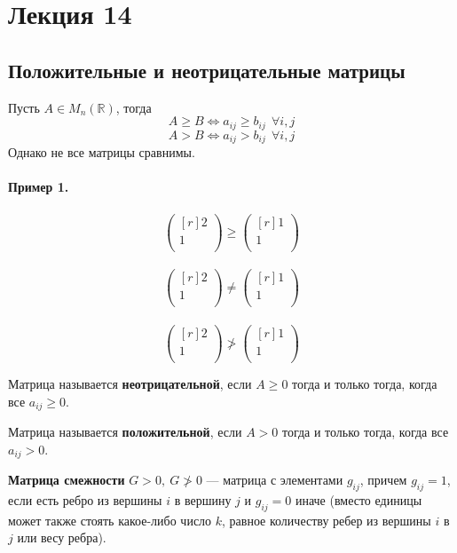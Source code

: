 \newpage
\section{Лекция 14}
\subsection{Положительные и неотрицательные матрицы}
Пусть $A\in M_n(\mathbb{R})$, тогда
$$A\geqslant B \Leftrightarrow a_{ij}\geqslant b_{ij} ~~\forall i, j$$
$$A> B \Leftrightarrow a_{ij}> b_{ij} ~~\forall i, j$$
Однако не все матрицы сравнимы.\\
\\
\textbf{Пример 1.}\\ \\
\[\begin{pmatrix}[r]
2\\
1\\
\end{pmatrix}\geqslant \begin{pmatrix}[r]
1\\
1\\
\end{pmatrix}\]\\
\[\begin{pmatrix}[r]
2\\
1\\
\end{pmatrix}\neq \begin{pmatrix}[r]
1\\
1\\
\end{pmatrix}\]\\
\[\begin{pmatrix}[r]
2\\
1\\
\end{pmatrix}\ngtr \begin{pmatrix}[r]
1\\
1\\
\end{pmatrix}\]
\begin{definition}
    Матрица называется \textbf{неотрицательной}, если $A\geqslant 0$ тогда и только тогда, когда все $a_{ij}\geqslant 0$.
\end{definition}
\begin{definition}
    Матрица называется \textbf{положительной}, если $A> 0$ тогда и только тогда, когда все $a_{ij}> 0$.
\end{definition}
\begin{definition}
    \textbf{Матрица смежности} $G>0,~G\ngtr 0$ --- матрица с элементами $g_{ij}$, причем $g_{ij}=1$, если есть ребро из вершины $i$ в вершину $j$ и $g_{ij}=0$ иначе (вместо единицы может также стоять какое-либо число $k$, равное количеству ребер из вершины $i$ в $j$ или весу ребра).
\end{definition}
